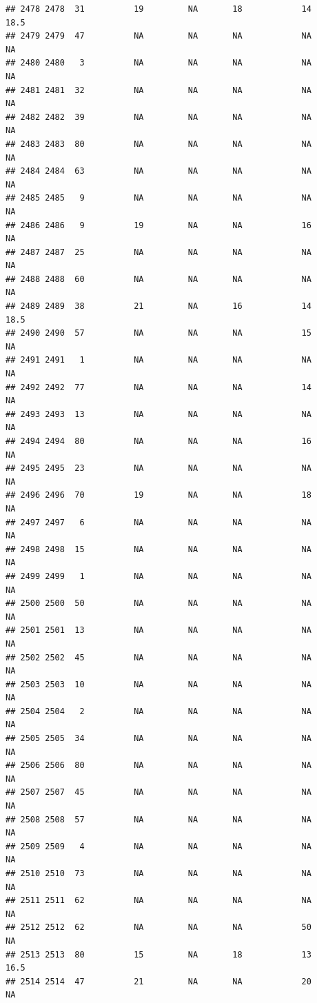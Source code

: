 \documentclass[man]{apa6}
\begin{document}
\begin{verbatim}
## 2478 2478  31          19         NA       18            14     18.5
## 2479 2479  47          NA         NA       NA            NA       NA
## 2480 2480   3          NA         NA       NA            NA       NA
## 2481 2481  32          NA         NA       NA            NA       NA
## 2482 2482  39          NA         NA       NA            NA       NA
## 2483 2483  80          NA         NA       NA            NA       NA
## 2484 2484  63          NA         NA       NA            NA       NA
## 2485 2485   9          NA         NA       NA            NA       NA
## 2486 2486   9          19         NA       NA            16       NA
## 2487 2487  25          NA         NA       NA            NA       NA
## 2488 2488  60          NA         NA       NA            NA       NA
## 2489 2489  38          21         NA       16            14     18.5
## 2490 2490  57          NA         NA       NA            15       NA
## 2491 2491   1          NA         NA       NA            NA       NA
## 2492 2492  77          NA         NA       NA            14       NA
## 2493 2493  13          NA         NA       NA            NA       NA
## 2494 2494  80          NA         NA       NA            16       NA
## 2495 2495  23          NA         NA       NA            NA       NA
## 2496 2496  70          19         NA       NA            18       NA
## 2497 2497   6          NA         NA       NA            NA       NA
## 2498 2498  15          NA         NA       NA            NA       NA
## 2499 2499   1          NA         NA       NA            NA       NA
## 2500 2500  50          NA         NA       NA            NA       NA
## 2501 2501  13          NA         NA       NA            NA       NA
## 2502 2502  45          NA         NA       NA            NA       NA
## 2503 2503  10          NA         NA       NA            NA       NA
## 2504 2504   2          NA         NA       NA            NA       NA
## 2505 2505  34          NA         NA       NA            NA       NA
## 2506 2506  80          NA         NA       NA            NA       NA
## 2507 2507  45          NA         NA       NA            NA       NA
## 2508 2508  57          NA         NA       NA            NA       NA
## 2509 2509   4          NA         NA       NA            NA       NA
## 2510 2510  73          NA         NA       NA            NA       NA
## 2511 2511  62          NA         NA       NA            NA       NA
## 2512 2512  62          NA         NA       NA            50       NA
## 2513 2513  80          15         NA       18            13     16.5
## 2514 2514  47          21         NA       NA            20       NA

\end{verbatim}
\end{document}
